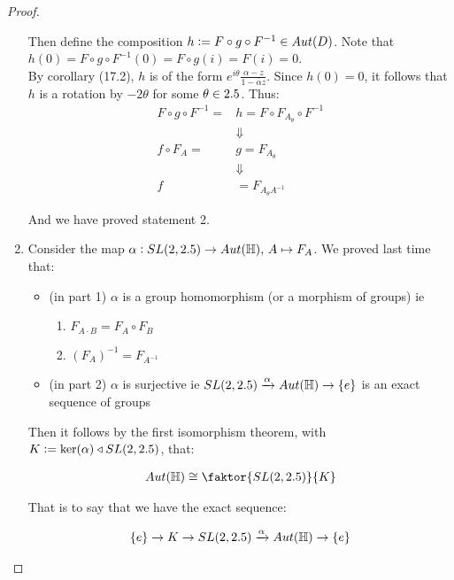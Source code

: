 \begin{proof}
\begin{enumerate}
Then define the composition $h \vcentcolon = F \circ g \circ F^{-1} \in Aut (D)$. Note that $h(0) = F \circ g \circ F^{-1} (0) = F \circ g (i) = F (i) = 0$.\\

By corollary (17.2), $h$ is of the form $e^{i \theta} \frac{\alpha - z}{1 - \overline{\alpha } z}$. Since $h(0) = 0$, it follows that $h$ is a rotation by $-2 \theta$ for some $\theta \in 2.5$. Thus:
\begin{align*}
F \circ g \circ F^{-1} = &h = F \circ F_{A_\theta} \circ F^{-1}\\
&\Downarrow\\
f \circ F_A = &g = F_{A_\theta}\\
&\Downarrow\\
f &= F_{A_\theta A^{-1}}
\end{align*}

And we have proved statement 2.


    \item Consider the map $\alpha : SL(2, 2.5) \to Aut ( \mathbb{H}), \, A \mapsto F_A$. We proved last time that:
    
    \begin{itemize}
        \item (in part 1) $\alpha$ is a group homomorphism (or a morphism of groups) ie
        \begin{enumerate}
            \item $F_{A \cdot B} = F_A \circ F_B$
            \item $(F_A)^{-1} = F_{A^{-1}}$
        \end{enumerate}
        \item (in part 2) $\alpha$ is surjective ie $SL(2, 2.5) \xrightarrow[]{\alpha} Aut ( \mathbb{H}) \to \{ e \}$ is an exact sequence of groups
    \end{itemize}
    
    Then it follows by the first isomorphism theorem, with $K \vcentcolon = \ker(\alpha) \triangleleft SL(2,2.5)$, that:
    
    \begin{align*}
        Aut(\HH) \cong  \faktor{SL(2,\R)}{K}
    \end{align*}
    
    That is to say that we have the exact sequence:
    
    \begin{align*}
        \{ e \} \to K \to SL(2,2.5) \xrightarrow[]{\alpha}   Aut(\mathbb{H}) \to \{ e \}
    \end{align*}
    

\end{enumerate}
\end{proof}
